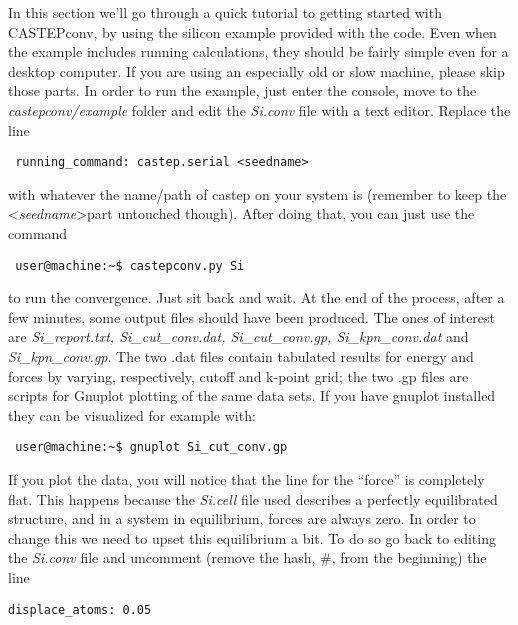 \documentclass[10pt]{article}
\begin{document}
In this section we'll go through a quick tutorial to getting started with CASTEPconv, by using the silicon example provided with the code. Even when the example includes running calculations, they should be fairly simple even for a desktop computer. If you are using an especially old or slow machine, please skip those parts.\newline
In order to run the example, just enter the console, move to the \textit{castepconv/example} folder and edit the \textit{Si.conv} file with a text editor. Replace the line

\begin{lstlisting}
 running_command: castep.serial <seedname>
\end{lstlisting}

with whatever the name/path of castep on your system is (remember to keep the \textless \textit{seedname}\textgreater part untouched though). After doing that, you can just use the command

\begin{lstlisting}
 user@machine:~$ castepconv.py Si
\end{lstlisting}

to run the convergence. Just sit back and wait. At the end of the process, after a few minutes, some output files should have been produced. The ones of interest are \textit {Si\_report.txt, Si\_cut\_conv.dat, Si\_cut\_conv.gp, Si\_kpn\_conv.dat} and \textit{Si\_kpn\_conv.gp}. The two .dat files contain tabulated results for energy and forces by varying, respectively, cutoff and k-point grid; the two .gp files are scripts for Gnuplot plotting of the same data sets. If you have gnuplot installed they can be visualized for example with:

\begin{lstlisting}
 user@machine:~$ gnuplot Si_cut_conv.gp
\end{lstlisting}

If you plot the data, you will notice that the line for the ``force'' is completely flat. This happens because the \textit{Si.cell} file used describes a perfectly equilibrated structure, and in a system in equilibrium, forces are always zero. In order to change this we need to upset this equilibrium a bit. To do so go back to editing the \textit{Si.conv} file and uncomment (remove the hash, \#, from the beginning) the line

\begin{lstlisting}
displace_atoms: 0.05
\end{lstlisting}
\end{document}
